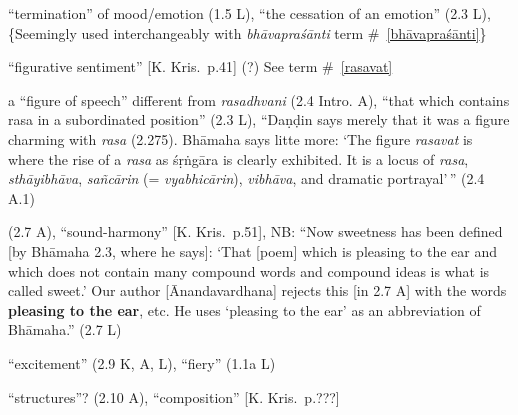 \documentclass[10pt]{article}
\begin{document}
\begin{multicols}{2}
\begin{enumerate}[
			leftmargin=0em,
			rightmargin=0em,
		]
		 ``termination'' of mood/emotion (1.5 L),
		``the cessation of an emotion'' (2.3 L),
		\{Seemingly used interchangeably with \textit{bhāvapraśānti} term \#~\ref{bhāvapraśānti}\}

		 ``figurative sentiment'' [K. Kris.\ p.41] (?)
		See term \#~\ref{rasavat}

		 a ``figure of speech'' different from \textit{rasadhvani} (2.4 Intro. A),
		``that which contains rasa in a subordinated position'' (2.3 L),
		``Daṇḍin says merely that it was a figure charming with \textit{rasa} (2.275).
		Bhāmaha says litte more: `The figure \textit{rasavat} is where the rise of a \textit{rasa} as śṛṅgāra is clearly exhibited. It is a locus of \textit{rasa}, \textit{sthāyibhāva}, \textit{sañcārin} (= \textit{vyabhicārin}), \textit{vibhāva}, and dramatic portrayal'\,'' (2.4 A.1)%



		 (2.7 A),
		``sound-harmony'' [K. Kris.\ p.51],
		NB: ``Now sweetness has been defined [by Bhāmaha 2.3, where he says]:
		`That [poem] which is pleasing to the ear and which does not contain many compound words and compound ideas is what is called sweet.'
		Our author [Ānandavardhana] rejects this [in 2.7 A] with the words \textbf{pleasing to the ear}, etc.
		He uses `pleasing to the ear' as an abbreviation of Bhāmaha.'' (2.7 L)

		 ``excitement'' (2.9 K, A, L), ``fiery'' (1.1a L)

		 ``structures''? (2.10 A), ``composition'' [K. Kris.\ p.???]




\end{enumerate}
\end{multicols}
\end{document}
